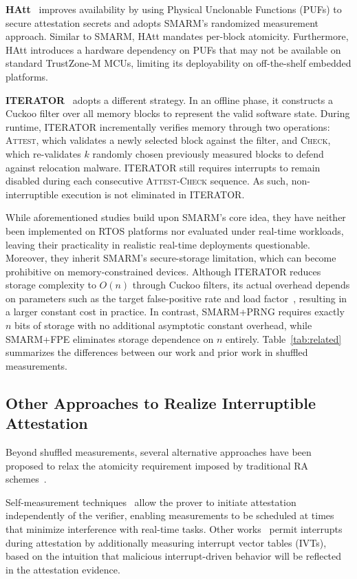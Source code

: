 \documentclass[journal]{IEEEtran}
\newcommand{\rtsmarmone}{SMARM+PRNG\xspace}
\newcommand{\rtsmarmtwo}{SMARM+FPE\xspace}
\begin{document}
\textbf{HAtt}~\cite{hatt} improves availability by
using Physical Unclonable Functions (PUFs) to secure
attestation secrets and adopts SMARM's randomized
measurement approach. 
Similar to SMARM, HAtt mandates per-block atomicity.
Furthermore, HAtt introduces a hardware dependency on PUFs that may not be available on standard TrustZone-M MCUs, limiting its deployability on off-the-shelf embedded platforms.


\textbf{ITERATOR}~\cite{iterator} adopts a different strategy.
In an offline phase, it constructs a Cuckoo filter over all memory blocks to represent the valid software state.
During runtime, ITERATOR incrementally verifies memory through two operations: \textsc{Attest}, which validates a newly selected block against the filter, and \textsc{Check}, which re-validates $k$ randomly chosen previously measured blocks to defend against relocation malware.
ITERATOR still requires interrupts to remain disabled during each consecutive \textsc{Attest}-\textsc{Check} sequence.
As such, non-interruptible execution is not eliminated in ITERATOR.

While aforementioned studies build upon SMARM's core idea, they have neither been implemented on RTOS platforms nor evaluated under real-time workloads, leaving their practicality in realistic real-time deployments questionable.
Moreover, they inherit SMARM's secure-storage limitation, which can become prohibitive on memory-constrained devices.
Although ITERATOR reduces storage complexity to $O(n)$ through Cuckoo filters, its actual overhead depends on parameters such as the target false-positive rate and load factor~\cite{fan2014cuckoo}, resulting in a larger constant cost in practice.
In contrast, \rtsmarmone requires exactly $n$ bits of storage with no additional asymptotic constant overhead, while \rtsmarmtwo eliminates storage dependence on $n$ entirely.
Table~\ref{tab:related} summarizes the differences between our work and prior work in shuffled measurements.

\subsection{Other Approaches to Realize Interruptible Attestation}
\label{sec:related-ra}

Beyond shuffled measurements, several alternative approaches have been proposed to relax the atomicity requirement imposed by traditional RA schemes~\cite{ra_survey,hydra,smart,nunes2024toward,sancus2}.

Self-measurement techniques~\cite{erasmus,carpent2018reconciling,iterator} allow the prover to initiate attestation independently of the verifier, enabling measurements to be scheduled at times that minimize interference with real-time tasks.
Other works~\cite{iscflat,asap,pistis} permit interrupts during attestation by additionally measuring interrupt vector tables (IVTs), based on the intuition that malicious interrupt-driven behavior will be reflected in the attestation evidence.
\end{document}
